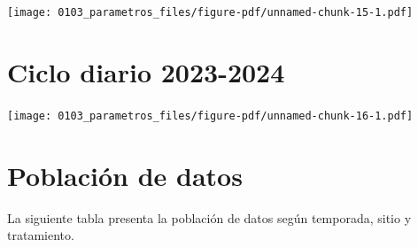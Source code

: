 \documentclass[
  letterpaper,
  DIV=11,
  numbers=noendperiod]{scrreprt}
\begin{document}
\begin{center}
\texttt{[image: 0103\_parametros\_files/figure-pdf/unnamed-chunk-15-1.pdf]}
\end{center}

\chapter{Ciclo diario 2023-2024}

\begin{center}
\texttt{[image: 0103\_parametros\_files/figure-pdf/unnamed-chunk-16-1.pdf]}
\end{center}

\chapter{Población de datos}

La siguiente tabla presenta la población de datos según temporada, sitio
y tratamiento.
\end{document}
